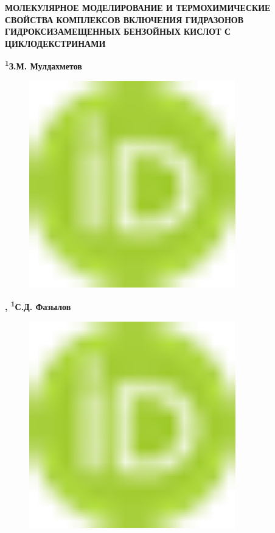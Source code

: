 
{\bfseries МОЛЕКУЛЯРНОЕ МОДЕЛИРОВАНИЕ И ТЕРМОХИМИЧЕСКИЕ СВОЙСТВА КОМПЛЕКСОВ
ВКЛЮЧЕНИЯ ГИДРАЗОНОВ ГИДРОКСИЗАМЕЩЕННЫХ БЕНЗОЙНЫХ КИСЛОТ С
ЦИКЛОДЕКСТРИНАМИ}

{\bfseries \textsuperscript{1}З.М.
Мулдахметов}
\begin{figure}[H]
	\centering
	\includegraphics[width=0.8\textwidth]{media/chem2/image1}
	\caption*{}
\end{figure}
{\bfseries ,
\textsuperscript{1}С.Д.
Фазылов}
\begin{figure}[H]
	\centering
	\includegraphics[width=0.8\textwidth]{media/chem2/image1}
	\caption*{}
\end{figure}
